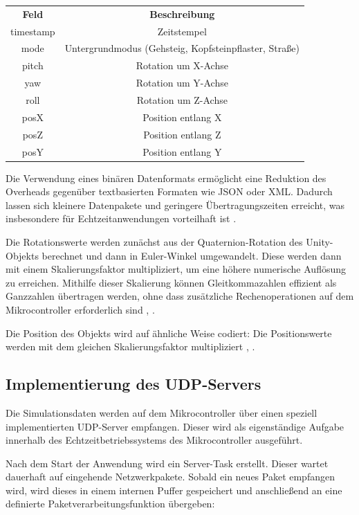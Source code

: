 \begin{center}
\begin{tabular}{ c c }
 \textbf{Feld} & \textbf{Beschreibung} \\ 
 timestamp & Zeitstempel \\  
 mode & Untergrundmodus (Gehsteig, Kopfsteinpflaster, Straße) \\
 pitch & Rotation um X-Achse \\
 yaw & Rotation um Y-Achse \\
 roll & Rotation um Z-Achse \\
 posX & Position entlang X \\
 posZ & Position entlang Z \\
 posY & Position entlang Y
\end{tabular}
\end{center}
Die Verwendung eines binären Datenformats ermöglicht eine Reduktion des Overheads gegenüber textbasierten Formaten wie JSON oder XML. Dadurch lassen sich kleinere Datenpakete und geringere Übertragungszeiten erreicht, was insbesondere für Echtzeitanwendungen vorteilhaft ist \cite{Microsoft}.

Die Rotationswerte werden zunächst aus der Quaternion-Rotation des Unity-Objekts berechnet und dann in Euler-Winkel umgewandelt. Diese werden dann mit einem Skalierungsfaktor multipliziert, um eine höhere numerische Auflösung zu erreichen. Mithilfe dieser Skalierung können Gleitkommazahlen effizient als Ganzzahlen übertragen werden, ohne dass zusätzliche Rechenoperationen auf dem Mikrocontroller erforderlich sind \cite{Unity12}, \cite{Goldberg1991}.

Die Position des Objekts wird auf ähnliche Weise codiert: Die Positionswerte werden mit dem gleichen Skalierungsfaktor multipliziert \cite{Unity12}, \cite{Goldberg1991}.

\subsection{Implementierung des UDP-Servers}
Die Simulationsdaten werden auf dem Mikrocontroller über einen speziell implementierten UDP-Server empfangen. Dieser wird als eigenständige Aufgabe innerhalb des Echtzeitbetriebssystems des Mikrocontroller ausgeführt.

Nach dem Start der Anwendung wird ein Server-Task erstellt. Dieser wartet dauerhaft auf eingehende Netzwerkpakete. Sobald ein neues Paket empfangen wird, wird dieses in einem internen Puffer gespeichert und anschließend an eine definierte Paketverarbeitungsfunktion übergeben:

